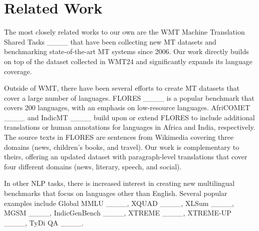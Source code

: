 \section{Related Work}
The most closely related works to our own are the WMT Machine Translation Shared Tasks ____ that have been collecting new MT datasets and benchmarking state-of-the-art MT systems since 2006.
Our work directly builds on top of the dataset collected in WMT24 and significantly expands its language coverage.

Outside of WMT, there have been several efforts to create MT datasets that cover a large number of languages.
FLORES ____ is a popular benchmark that covers 200 languages, with an emphasis on low-resource languages.
AfriCOMET ____ and IndicMT ____ build upon or extend FLORES to include additional translations or human annotations for languages in Africa and India, respectively.
The source texts in FLORES are sentences from Wikimedia covering three domains (news, children's books, and travel).
Our work is complementary to theirs, offering an updated dataset with paragraph-level translations that cover four different domains (news, literary, speech, and social). 

In other NLP tasks, there is increased interest in creating new multilingual benchmarks that focus on languages other than English.
Several popular examples include Global MMLU ____,
XQUAD ____,
XLSum ____,
MGSM ____,
IndicGenBench ____,
XTREME ____,
XTREME-UP ____,
TyDi QA ____.
